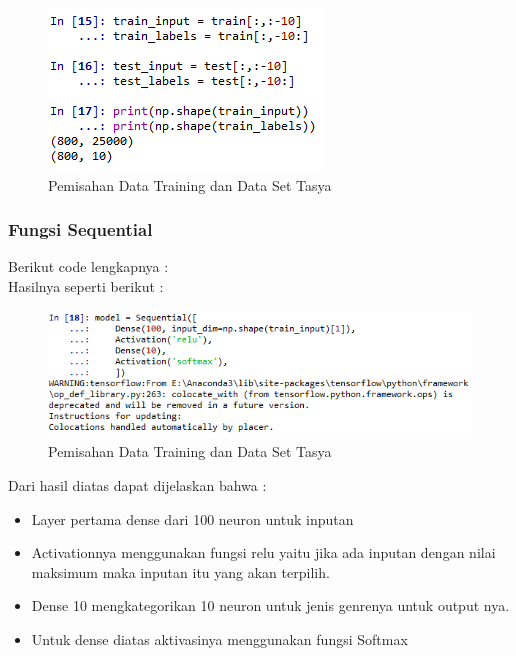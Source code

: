 \begin{itemize}
\begin{figure}[ht]
\centering
\includegraphics[scale=0.5]{figures/chapter6tasya16.png}
\caption{Pemisahan Data Training dan Data Set Tasya}
\label{Praktek}
\end{figure}
\end{itemize}

\subsubsection{Fungsi Sequential}
Berikut code lengkapnya :\\

Hasilnya seperti berikut :\\
\begin{figure}[ht]
\centering
\includegraphics[scale=0.5]{figures/chapter6tasya17.png}
\caption{Pemisahan Data Training dan Data Set Tasya}
\label{Praktek}
\end{figure}
Dari hasil diatas dapat dijelaskan bahwa :\\
\begin{itemize}
\item Layer pertama dense dari 100 neuron untuk inputan
\item Activationnya menggunakan fungsi relu yaitu jika ada inputan dengan nilai maksimum maka inputan itu yang akan terpilih.
\item Dense 10 mengkategorikan 10 neuron untuk jenis genrenya untuk output nya.
\item Untuk dense diatas aktivasinya menggunakan fungsi Softmax
\end{itemize}

